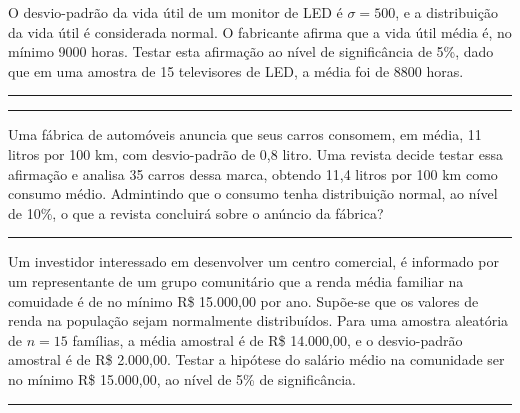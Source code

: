 \documentclass[a4paper,11pt,fleqn]{article}\usepackage[]{graphicx}\usepackage[]{color}
\theoremstyle{definition}
\begin{document}
\begin{compactenum}[15.] %
\item O desvio-padrão da vida útil de um monitor de LED é $\sigma =
  500$, e a distribuição da vida útil é considerada normal. O fabricante
  afirma que a vida útil média é, no mínimo 9000 horas. Testar esta
  afirmação ao nível de significância de 5\%, dado que em uma amostra de
  15 televisores de LED, a média foi de 8800 horas.
\end{compactenum}

\vspace{0.3cm}
\hrule
\vspace{0.3cm}

\clearpage

\vspace{0.3cm}
\hrule
\vspace{0.3cm}

\begin{compactenum}[16.] %
\item Uma fábrica de automóveis anuncia que seus carros consomem, em
  média, 11 litros por 100 km, com desvio-padrão de 0,8 litro. Uma
  revista decide testar essa afirmação e analisa 35 carros dessa marca,
  obtendo 11,4 litros por 100 km como consumo médio. Admintindo que o
  consumo tenha distribuição normal, ao nível de 10\%, o que a revista
  concluirá sobre o anúncio da fábrica?
\end{compactenum}

\vspace{0.3cm}
\hrule
\vspace{0.3cm}

\begin{compactenum}[17.] %
\item Um investidor interessado em desenvolver um centro comercial, é
  informado por um representante de um grupo comunitário que a renda
  média familiar na comuidade é de no mínimo R\$ 15.000,00 por
  ano. Supõe-se que os valores de renda na população sejam normalmente
  distribuídos. Para uma amostra aleatória de $n=15$ famílias, a média
  amostral é de R\$ 14.000,00, e o desvio-padrão amostral é de R\$
  2.000,00. Testar a hipótese do salário médio na comunidade ser no
  mínimo R\$ 15.000,00, ao nível de 5\% de significância.
\end{compactenum}

\vspace{0.3cm}
\hrule
\vspace{0.3cm}
\end{document}
